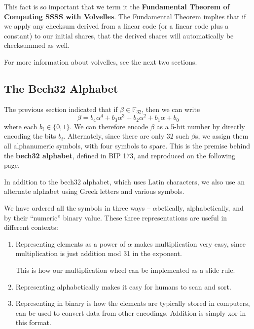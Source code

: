\documentclass[letterpaper]{article}
\theoremstyle{xxx}
\theoremstyle{evil}
\theoremstyle{yyy}
\theoremstyle{plain}
\theoremstyle{zzz}
\newcommand{\fttwo}{\mathbb{F}_{32}}
\begin{document}
This fact is so important that we term it the \textbf{Fundamental Theorem of
Computing SSSS with Volvelles}. The Fundamental Theorem implies that if we
apply any checksum derived from a linear code (or a linear code plus a
constant) to our initial shares, that the derived shares will automatically
be checksummed as well.

For more information about volvelles, see the next two sections.

\subsection{The Bech32 Alphabet}

The previous section indicated that if $\beta\in\fttwo$, then we can write
\[ \beta = b_4\alpha^4 + b_3\alpha^3 + b_2\alpha^2 + b_1\alpha + b_0 \]
where each $b_i\in\{0, 1\}$. We can therefore encode $\beta$ as a 5-bit
number by directly encoding the bits $b_i$. Alternately, since there are
only 32 such $\beta$s, we assign them all alphanumeric symbols, with four
symbols to spare. This is the premise behind the \textbf{bech32 alphabet},
defined in BIP 173, and reproduced on the following page.

In addition to the bech32 alphabet, which uses Latin characters, we also use
an alternate alphabet using Greek letters and various symbols.

We have ordered all the symbols in three ways -- $\alpha$betically,
alphabetically, and by their ``numeric'' binary value. These three
representations are useful in different contexts:
\begin{enumerate}
\item Representing elements as a power of $\alpha$ makes multiplication
very easy, since multiplication is just addition mod 31 in the exponent.

This is how our multiplication wheel can be implemented as a slide rule.
\item Representing alphabetically makes it easy for humans to scan and sort.
\item Representing in binary is how the elements are typically stored in
computers, can be used to convert data from other encodings. Addition is
simply xor in this format.
\end{enumerate}

\clearpage
~\\~\\~\\~\\ %
\end{document}
